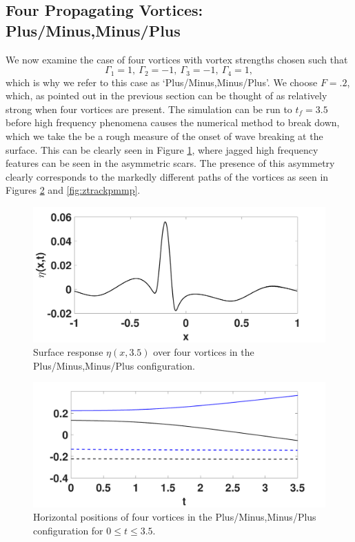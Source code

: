 \documentclass[a4paper,11pt]{article}
\begin{document}
\subsection*{Four Propagating Vortices: Plus/Minus,Minus/Plus}
We now examine the case of four vortices with vortex strengths chosen such that
\[
\Gamma_{1}=1, ~ \Gamma_{2}=-1, ~ \Gamma_{3}=-1,~\Gamma_{4}=1,
\]
which is why we refer to this case as `Plus/Minus,Minus/Plus'.  We choose $F=.2$, which, as pointed out in the previous section can be thought of as relatively strong when four vortices are present.  The simulation can be run to $t_{f}=3.5$ before high frequency phenomena causes the numerical method to break down, which we take the be a rough measure of the onset of wave breaking at the surface.  This can be clearly seen in Figure \ref{fig:surfreppmmp}, where jagged high frequency features can be seen in the asymmetric scars.  The presence of this asymmetry clearly corresponds to the markedly different paths of the vortices as seen in Figures \ref{fig:xtrackpmmp} and \ref{fig:ztrackpmmp}.
\begin{figure}[!h]
\centering
\includegraphics[width=.75\textwidth]{surf_resp_mu_pt2_F_pt2_tf_3pt5_pmmp}
\caption{Surface response $\eta(x,3.5)$ over four vortices in the Plus/Minus,Minus/Plus configuration.}
\label{fig:surfreppmmp}
\end{figure}
\begin{figure}[!h]
\centering
\includegraphics[width=.75\textwidth]{xtrack_mu_pt2_F_pt2_tf_3pt5_pmmp}
\caption{Horizontal positions of four vortices in the Plus/Minus,Minus/Plus configuration for $0\leq t \leq 3.5$.}
\label{fig:xtrackpmmp}
\end{figure}
\end{document}
